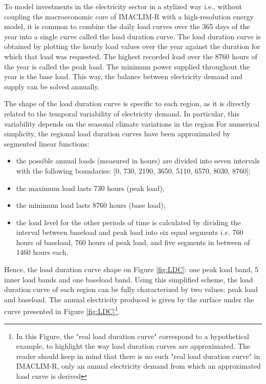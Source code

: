 To model investments in the electricity sector in a stylized way i.e., without coupling the macroeconomic core of IMACLIM-R with a high-resolution energy model, it is common to combine the daily load curves over the 365 days of the year into a single curve called the load duration curve.
The load duration curve is obtained by plotting the hourly load values over the year against the duration for which that load was requested. The highest recorded load over the 8760 hours of the year is called the peak load. The minimum power supplied throughout the year is the base load. This way, the balance between electricity demand and supply can be solved annually.


The shape of the load duration curve is specific to each region, as it is directly related to the temporal variability of electricity demand. In particular, this variability depends on the seasonal climate variations in the region
For numerical simplicity, the regional load duration curves have been approximated by segmented linear functions:
\begin{itemize}
    \item the possible annual loads (measured in hours) are divided into seven intervals with the following boundaries: [0, 730, 2190, 3650, 5110, 6570, 8030, 8760];
    \item the maximum load lasts 730 hours (peak load);
    \item the minimum load lasts 8760 hours (base load);
    \item the load level for the other periods of time is calculated by dividing the interval between baseload and peak load into six equal segments $i.e.$ 760 hours of baseload, 760 hours of peak load, and five segments in between of 1460 hours each.
\end{itemize}

Hence, the load duration curve shape on Figure \ref{fig:LDC}: one peak load band, 5 inner load bands and one baseload band.
Using this simplified scheme, the load duration curve of each region can be fully characterized by two values: peak load and baseload. The annual electricity produced is given by the surface under the curve presented in Figure \ref{fig:LDC}\footnote{In this Figure, the "real load duration curve" correspond to a hypothetical example, to highlight the way load duration curves are approximated. The reader should keep in mind that there is no such "real load duration curve" in IMACLIM-R, only an annual electricity demand from which an approximated load curve is derived}.

